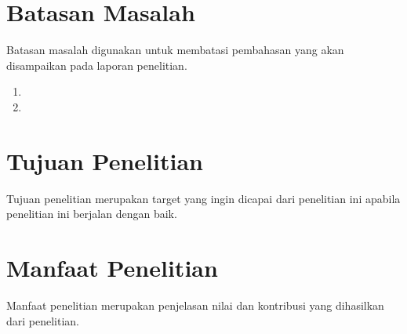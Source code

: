 
\section{Batasan Masalah}
\label{sec:batasan}

Batasan masalah digunakan untuk membatasi pembahasan yang akan disampaikan pada laporan penelitian.
\begin{enumerate}
  \item {}
  \item {}
\end{enumerate}

\section{Tujuan Penelitian}
\label{sec:tujuan}

Tujuan penelitian merupakan target yang ingin dicapai dari penelitian ini apabila penelitian ini berjalan dengan baik. 

\section{Manfaat Penelitian}
\label{sec:manfaat}

Manfaat penelitian merupakan penjelasan nilai dan kontribusi yang dihasilkan dari penelitian.
